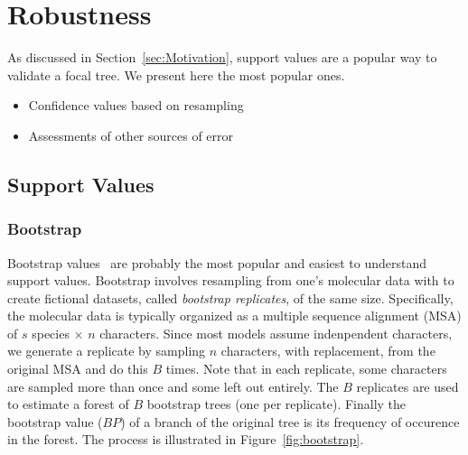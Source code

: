 \section{Robustness} \label{sec:robustness}

As discussed in Section~\ref{sec:Motivation}, support values are a popular way to validate a focal tree. We present here the most popular ones. 

\begin{itemize}
 \item Confidence values based on resampling
 \item Assessments of other sources of error
\end{itemize}

\subsection{Support Values} \label{sec:confidence-values}

\subsubsection{Bootstrap} \label{sec:bootstrap}

Bootstrap values~\cite{Felsenstein1985} are probably the most popular and easiest to understand support values. Bootstrap involves resampling from one's molecular data with to create fictional datasets, called \emph{bootstrap replicates}, of the same size. Specifically, the molecular data is typically organized as a multiple sequence alignment (MSA) of $s$ species $\times$ $n$ characters. Since most models assume indenpendent characters, we generate a replicate by sampling $n$ characters, with replacement, from the original MSA and do this $B$ times. Note that in each replicate, some characters are sampled more than once and some left out entirely. The $B$ replicates are used to estimate a forest of $B$ bootstrap trees (one per replicate). Finally the bootstrap value ($BP$) of a branch of the original tree is its frequency of occurence in the forest. The process is illustrated in Figure~\ref{fig:bootstrap}. 


